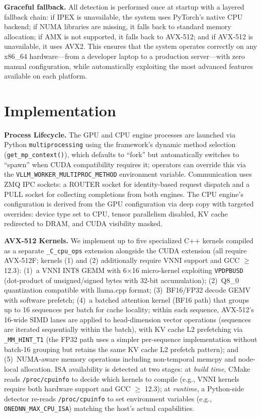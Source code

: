 \documentclass[10pt,conference]{IEEEtran}
\begin{document}
\textbf{Graceful fallback.}
All detection is performed once at startup with a layered fallback chain: if IPEX is unavailable, the system uses PyTorch's native CPU backend; if NUMA libraries are missing, it falls back to standard memory allocation; if AMX is not supported, it falls back to AVX-512; and if AVX-512 is unavailable, it uses AVX2.
This ensures that the system operates correctly on any x86\_64 hardware---from a developer laptop to a production server---with zero manual configuration, while automatically exploiting the most advanced features available on each platform.

\section{Implementation}
\label{sec:impl}

\textbf{Process Lifecycle.}
The GPU and CPU engine processes are launched via Python \texttt{multiprocessing} using the framework's dynamic method selection (\texttt{get\_mp\_context()}), which defaults to ``fork'' but automatically switches to ``spawn'' when CUDA compatibility requires it; operators can override this via the \texttt{VLLM\_WORKER\_MULTIPROC\_METHOD} environment variable.
Communication uses ZMQ IPC sockets: a ROUTER socket for identity-based request dispatch and a PULL socket for collecting completions from both engines.
The CPU engine's configuration is derived from the GPU configuration via deep copy with targeted overrides: device type set to CPU, tensor parallelism disabled, KV cache redirected to DRAM, and CUDA visibility masked.

\textbf{AVX-512 Kernels.}
We implement up to five specialized C++ kernels compiled as a separate \texttt{\_C\_cpu\_ops} extension alongside the CUDA extension (all require AVX-512F; kernels (1) and (2) additionally require VNNI support and GCC ${\geq}$ 12.3):
(1)~a VNNI INT8 GEMM with 6$\times$16 micro-kernel exploiting \texttt{VPDPBUSD} (dot-product of unsigned/signed bytes with 32-bit accumulation);
(2)~Q8\_0 quantization compatible with llama.cpp format;
(3)~BF16/FP32 decode GEMV with software prefetch;
(4)~a batched attention kernel (BF16 path) that groups up to 16 sequences per batch for cache locality; within each sequence, AVX-512's 16-wide SIMD lanes are applied to head-dimension vector operations (sequences are iterated sequentially within the batch), with KV cache L2 prefetching via \texttt{\_MM\_HINT\_T1} (the FP32 path uses a simpler per-sequence implementation without batch-16 grouping but retains the same KV cache L2 prefetch pattern);
and (5)~NUMA-aware memory operations including non-temporal memcpy and node-local allocation.
ISA availability is detected at two stages: at \emph{build time}, CMake reads \texttt{/proc/cpuinfo} to decide which kernels to compile (e.g., VNNI kernels require both hardware support and GCC $\geq$ 12.3); at \emph{runtime}, a Python-side detector re-reads \texttt{/proc/cpuinfo} to set environment variables (e.g., \texttt{ONEDNN\_MAX\_CPU\_ISA}) matching the host's actual capabilities.
\end{document}
